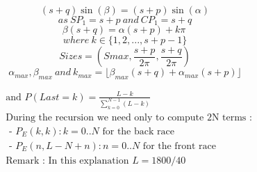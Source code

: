 \documentclass[10pt,a4paper]{letter}
\begin{document}
$$  
  (s+q)\sin (\beta) = (s+p) \sin(\alpha)
$$
$$
	as\: SP_{1} = s+p \:and\: CP_{1} = s+q
$$
$$ \beta(s+q) = \alpha(s+p) + k \pi\:
$$
$$
   where\: k\in\{1,2,...,s+p-1\}
$$
$$
Sizes=(Smax,\frac{s+p}{2\pi},\frac{s+q}{2\pi})
$$
$$
\alpha_{max},\beta_{max}\:and\:k_{max}=\lfloor\beta_{max}(s+q)+\alpha_{max}(s+p)\rfloor
$$

\begin{align*}
& \text{and }P(Last=k)=\frac{L-k}{\sum_{k=0}^{N-1}(L-k)}\\
& \text{During the recursion we need only to compute 2N terms :}\\
& \textit{    - P}_{E}(k,k):k=0..N \text{ for the back race}\\
& \textit{    - P}_{E}(n,L-N+n):n=0..N \text{ for the front race}\\
& \text{Remark : In this explanation }L=1800/40	
\end{align*}
\end{document}
